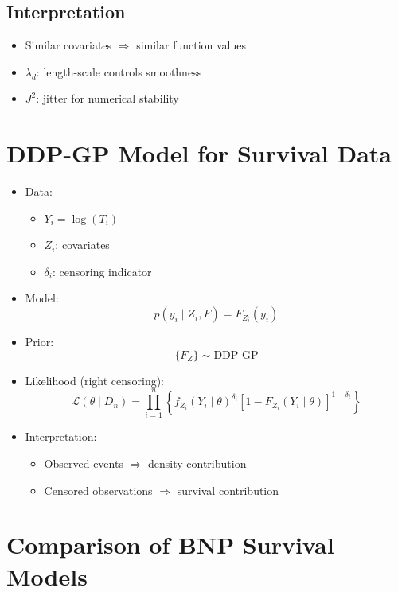 \documentclass[12pt,oneside]{book}
\numberwithin{equation}{section}
\theoremstyle{definition}
\theoremstyle{plain}
\theoremstyle{remark}
\begin{document}
\subsection{Interpretation}

\begin{itemize}
\item Similar covariates $\Rightarrow$ similar function values
\item $\lambda_d$: length-scale controls smoothness
\item $J^2$: jitter for numerical stability
\end{itemize}

\section{DDP-GP Model for Survival Data}

\begin{itemize}
\item Data:
\begin{itemize}
\item $Y_i = \log(T_i)$
\item $Z_i$: covariates
\item $\delta_i$: censoring indicator
\end{itemize}

\item Model:
\[
p(y_i \mid Z_i, F) = F_{Z_i}(y_i)
\]

\item Prior:
\[
\{F_Z\} \sim \text{DDP-GP}
\]

\item Likelihood (right censoring):
\[
\mathcal{L}(\theta \mid D_n)
=
\prod_{i=1}^n
\left\{ f_{Z_i}(Y_i \mid \theta)^{\delta_i}
\left[1 - F_{Z_i}(Y_i \mid \theta)\right]^{1-\delta_i} \right\}
\]

\item Interpretation:
\begin{itemize}
\item Observed events $\Rightarrow$ density contribution
\item Censored observations $\Rightarrow$ survival contribution
\end{itemize}
\end{itemize}

\section{Comparison of BNP Survival Models}
\end{document}
